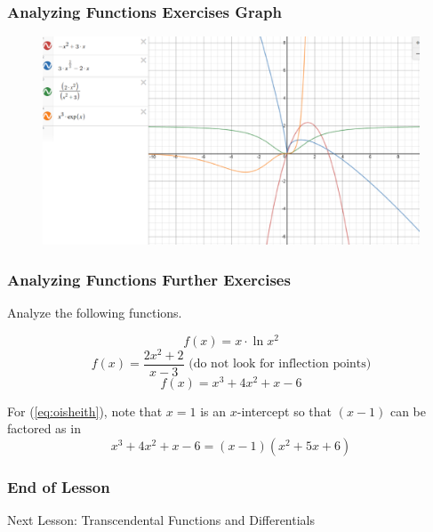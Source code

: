 \documentclass[xcolor=dvipsnames]{beamer}
\begin{document}
\begin{frame}
  \frametitle{Analyzing Functions Exercises Graph}
  \begin{figure}[h]
    \includegraphics[scale=.4]{./diagrams/ft-11-AnalyzingFunctions.eps}
  \end{figure}
\end{frame}

\begin{frame}
  \frametitle{Analyzing Functions Further Exercises}
Analyze the following functions.

\begin{equation}
  \label{eq:uufiexah}
f(x)=x\cdot\ln{}x^{2}
\end{equation}
\begin{equation}
  \label{eq:opeemuix}
f(x)=\frac{2x^{2}+2}{x-3}\mbox{ (do not look for inflection points)}
\end{equation}
\begin{equation}
  \label{eq:oisheith}
f(x)=x^{3}+4x^{2}+x-6
\end{equation}

\bigskip

For (\ref{eq:oisheith}), note that $x=1$ is an $x$-intercept so that
$(x-1)$ can be factored as in
\begin{equation}
  \label{eq:xohhafoe}
x^{3}+4x^{2}+x-6=(x-1)(x^{2}+5x+6)
\end{equation}
\end{frame}

\begin{frame}
  \frametitle{End of Lesson}
Next Lesson: Transcendental Functions and Differentials
\end{frame}
\end{document}
